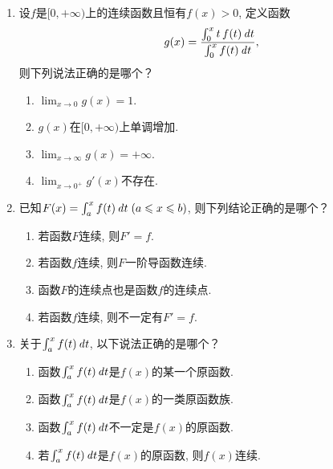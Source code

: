 \documentclass[a4paper,punct=CCT]{ctexbook}
\renewcommand*{\enumparen}[1]{（\makebox[0.6em][c]{\normalfont#1}）}
\theoremstyle{definition}
\theoremstyle{remark}
\newif\ifshowsol
\let\leq\leqslant
\let\le\leq
\begin{document}
\begin{enumerate}
\item 设\(f\)是\([0,+\infty)\)上的连续函数且恒有\(f(x) > 0\), 定义函数
  \[
    g(x) = \frac{\int_0^x t\,f(t) \mathop{}\!\mathit{d} t}{\int_0^x f(t) \mathop{}\!\mathit{d} t},
  \]
  则下列说法正确的是哪个？
  \begin{enumerate}
  \item \(\displaystyle \lim_{x\to0} g(x) = 1\).
  \item \(g(x)\)在\([0,+\infty)\)上单调增加.
  \item \(\displaystyle \lim_{x\to\infty} g(x) = +\infty\).
  \item \(\displaystyle \lim_{x\to0^+} g'(x)\)不存在.
  \end{enumerate}

  \ifshowsol
  易证\(\lim_{x\to0} g(x) = 0\)和\(\lim_{x\to0^+} g'(x) = 1/2\)．设\(f(t) = e^{-t}\), 那么这个函数就是\enumparen{c}的反例, 因为\(\lim_{x\to\infty} g(x) = 1\)．对于\(g\)求导, 有
  \[
    g'(x) = \frac{x\,f(x) \int_0^x f(t) \dt - f(x) \int_0^x t\,f(t) \dt}{\paren[\big]{\int_0^x f(t) \dt}^2}
    = f(x) \frac{\int_0^x (x-t)\,f(t) \dt}{\paren[\big]{\int_0^x f(t) \dt}^2}.
  \]
  对于所有的\(t \in (0, x)\), 都有\(x - t > 0\)和\(f(t) > 0\), 所以\(\int_0^x (x-t)\,f(t) \dt > 0\)．这就是说在\((0,+\infty)\)上\(g'(x) > 0\), 所以\(g(x)\)在\([0,+\infty)\)上单调增加.
  \fi

\item 已知\(F(x) = \int_a^x f(t) \dt \; (a \le x \le b)\), 则下列结论正确的是哪个？
  \begin{enumerate}
  \item 若函数\(F\)连续, 则\(F' = f\).
  \item 若函数\(f\)连续, 则\(F\)一阶导函数连续.
  \item 函数\(F\)的连续点也是函数\(f\)的连续点.
  \item 若函数\(f\)连续, 则不一定有\(F' = f\).
  \end{enumerate}

\item 关于\(\int_a^x f(t) \mathop{}\!\mathit{d} t\), 以下说法正确的是哪个？
  \begin{enumerate}
  \item 函数\(\int_a^x f(t) \mathop{}\!\mathit{d} t\)是\(f(x)\)的某一个原函数.
  \item 函数\(\int_a^x f(t) \mathop{}\!\mathit{d} t\)是\(f(x)\)的一类原函数族.
  \item 函数\(\int_a^x f(t) \mathop{}\!\mathit{d} t\)不一定是\(f(x)\)的原函数.
  \item 若\(\int_a^x f(t) \mathop{}\!\mathit{d} t\)是\(f(x)\)的原函数, 则\(f(x)\)连续.
  \end{enumerate}


\end{enumerate}
\end{document}
